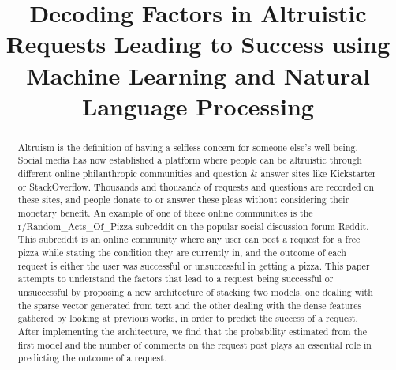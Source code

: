 \documentclass[conference]{IEEEtran}
\begin{document}
\title{Decoding Factors in Altruistic Requests Leading to Success using Machine Learning and Natural Language Processing\\
}

\author{
\and
{}
}

\maketitle

\begin{abstract}
Altruism is the definition of having a selfless concern for someone else’s well-being. Social media has now established a platform where people can be altruistic through different online philanthropic communities and question \& answer sites like Kickstarter or StackOverflow. Thousands and thousands of requests and questions are recorded on these sites, and people donate to or answer these pleas without considering their monetary benefit. An example of one of these online communities is the r/Random\_Acts\_Of\_Pizza subreddit on the popular social discussion forum Reddit. This subreddit is an online community where any user can post a request for a free pizza while stating the condition they are currently in, and the outcome of each request is either the user was successful or unsuccessful in getting a pizza. This paper attempts to understand the factors that lead to a request being successful or unsuccessful by proposing a new architecture of stacking two models, one dealing with the sparse vector generated from text and the other dealing with the dense features gathered by looking at previous works, in order to predict the success of a request. After implementing the architecture, we find that the probability estimated from the first model and the number of comments on the request post plays an essential role in predicting the outcome of a request.
\end{abstract}
\end{document}
